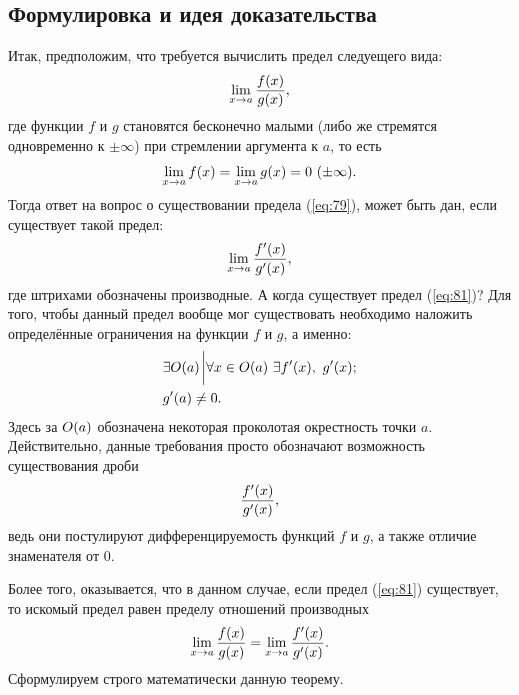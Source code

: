 \documentclass[12pt]{article}
\begin{document}
\subsection{Формулировка и идея доказательства}
Итак, предположим, что требуется вычислить предел следуещего вида:
\begin{equation}\label{eq:79}
    \lim_{x\rightarrow a}{\dfrac{f\qty(x)}{g\qty(x)}},
\end{equation}
где функции $f$ и $g$ становятся бесконечно малыми (либо же стремятся одновременно к $\pm \infty$) при стремлении аргумента к $a$, то есть
\begin{equation}
    \lim_{x\rightarrow a}{f\qty(x)} = \lim_{x\rightarrow a}{g\qty(x)} = 0\ (\pm\infty).
\end{equation}
Тогда ответ на вопрос о существовании предела (\ref{eq:79}), может быть дан, если существует такой предел:
\begin{equation}\label{eq:81}
    \lim_{x\rightarrow a}{\dfrac{f'\qty(x)}{g'\qty(x)}},
\end{equation}
где штрихами обозначены производные. А когда существует предел (\ref{eq:81})? Для того, чтобы данный предел вообще мог существовать необходимо наложить определённые ограничения на функции $f$ и $g$, а именно:
\begin{align}
    &\exists O\qty(a) \eval \forall x \in O\qty(a)\ \exists f'(x),\ g'(x);\\
    & g'\qty(a)\ne 0.
\end{align}
Здесь за $O\qty(a)$ обозначена некоторая проколотая окрестность точки $a$. Действительно, данные требования просто обозначают возможность существования дроби
\begin{equation}
    \dfrac{f'\qty(x)}{g'\qty(x)},
\end{equation}
ведь они постулируют дифференцируемость функций $f$ и $g$, а также отличие знаменателя от $0$.
\par
Более того, оказывается, что в данном случае, если предел (\ref{eq:81}) существует, то искомый предел равен пределу отношений производных
\begin{equation}
    \lim_{x\rightarrow a}{\dfrac{f\qty(x)}{g\qty(x)}} = \lim_{x\rightarrow a}{\dfrac{f'\qty(x)}{g'\qty(x)}}.
\end{equation}
Сформулируем строго математически данную теорему.
\end{document}
